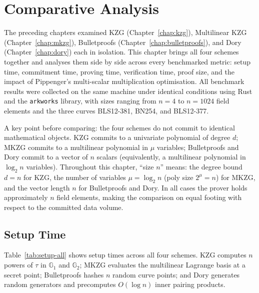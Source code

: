 
\chapter{Comparative Analysis}
\label{chap:comparison}

The preceding chapters examined KZG (Chapter~\ref{chap:kzg}),
Multilinear KZG (Chapter~\ref{chap:mkzg}),
Bulletproofs (Chapter~\ref{chap:bulletproofs}), and
Dory (Chapter~\ref{chap:dory}) each in isolation. This chapter brings
all four schemes together and analyses them side by side across every
benchmarked metric: setup time, commitment time, proving time,
verification time, proof size, and the impact of
Pippenger's multi-scalar multiplication optimisation. All benchmark
results were collected on the same machine under identical conditions
using Rust and the \texttt{arkworks} library, with sizes ranging from
$n = 4$ to $n = 1024$ field elements and the three curves
BLS12-381, BN254, and BLS12-377.

A key point before comparing: the four schemes do not commit to
identical mathematical objects. KZG commits to a univariate polynomial
of degree $d$; MKZG commits to a multilinear polynomial in $\mu$
variables; Bulletproofs and Dory commit to a vector of $n$ scalars
(equivalently, a multilinear polynomial in $\log_2 n$ variables).
Throughout this chapter, ``size $n$'' means: the degree bound $d = n$
for KZG, the number of variables $\mu = \log_2 n$ (poly size $2^\mu = n$)
for MKZG, and the vector length $n$ for Bulletproofs and Dory. In all
cases the prover holds approximately $n$ field elements, making the
comparison on equal footing with respect to the committed data volume.



\section{Setup Time}
\label{sec:setup-comparison}

Table~\ref{tab:setup-all} shows setup times across all four schemes.
KZG computes $n$ powers of $\tau$ in $\mathbb{G}_1$ and $\mathbb{G}_2$;
MKZG evaluates the multilinear Lagrange basis at a secret point;
Bulletproofs hashes $n$ random curve points; and Dory generates
random generators and precomputes $O(\log n)$ inner pairing products.

